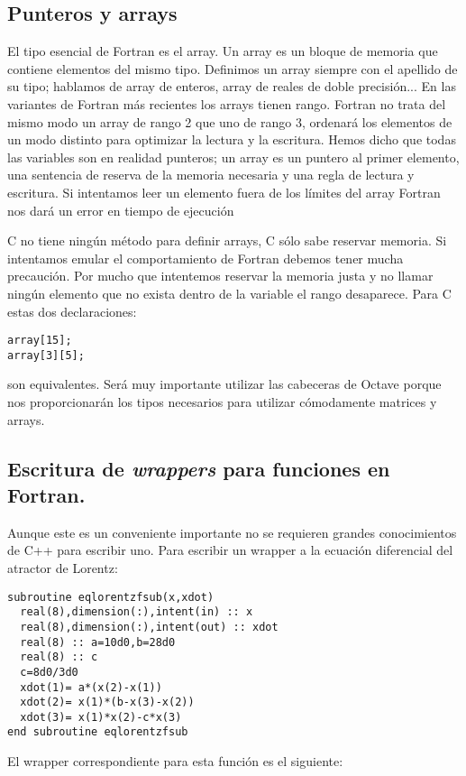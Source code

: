 \subsection{Punteros y arrays}

El tipo esencial de Fortran es el array. Un array es un bloque de
memoria que contiene elementos del mismo tipo. Definimos un array
siempre con el apellido de su tipo; hablamos de array de enteros,
array de reales de doble precisión... En las variantes de Fortran más
recientes los arrays tienen rango. Fortran no trata del mismo modo un
array de rango 2 que uno de rango 3, ordenará los elementos de un modo
distinto para optimizar la lectura y la escritura. Hemos dicho que
todas las variables son en realidad punteros; un array es un puntero
al primer elemento, una sentencia de reserva de la memoria necesaria y
una regla de lectura y escritura. Si intentamos leer un elemento fuera
de los límites del array Fortran nos dará un error en tiempo de
ejecución

C no tiene ningún método para definir arrays, C sólo sabe reservar
memoria. Si intentamos emular el comportamiento de Fortran debemos
tener mucha precaución. Por mucho que intentemos reservar la memoria
justa y no llamar ningún elemento que no exista dentro de la variable
el rango desaparece. Para C estas dos declaraciones:

\begin{verbatim}
array[15];
array[3][5];
\end{verbatim}
son equivalentes. Será muy importante utilizar las cabeceras de Octave
porque nos proporcionarán los tipos necesarios para utilizar
cómodamente matrices y arrays.


\subsection{Escritura de \emph{wrappers} para funciones en
  Fortran.}

Aunque este es un conveniente importante no se requieren grandes
conocimientos de C++ para escribir uno. Para escribir un wrapper a la
ecuación diferencial del atractor de Lorentz:

\begin{verbatim}
subroutine eqlorentzfsub(x,xdot)
  real(8),dimension(:),intent(in) :: x
  real(8),dimension(:),intent(out) :: xdot
  real(8) :: a=10d0,b=28d0
  real(8) :: c
  c=8d0/3d0
  xdot(1)= a*(x(2)-x(1))
  xdot(2)= x(1)*(b-x(3)-x(2))
  xdot(3)= x(1)*x(2)-c*x(3)
end subroutine eqlorentzfsub
\end{verbatim}
El wrapper correspondiente para esta función es el siguiente:

